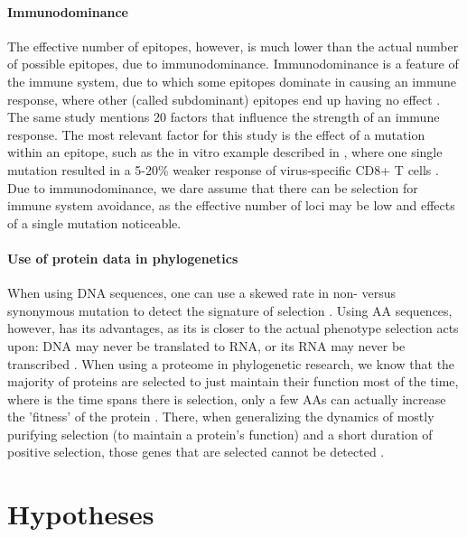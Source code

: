 \paragraph{Immunodominance}

The effective number of epitopes, however,
is much lower than the actual number of possible
epitopes, due to immunodominance. 
Immunodominance is a feature of the immune system,
due to which some epitopes dominate in causing an immune response,
where other (called subdominant) epitopes end up having no 
effect \cite{akram2012immunodominance}.
The same study mentions 20 factors that influence the strength
of an immune response.
The most relevant factor for this study is the effect of
a mutation within an epitope, 
such as the in vitro example described in \cite{berkhoff2004mutation},
where one single mutation resulted in a 5-20\% weaker
response of virus-specific CD8+ T cells .
Due to immunodominance, we dare assume that there can be selection
for immune system avoidance, as the effective number of loci may be
low and effects of a single mutation noticeable.

\paragraph{Use of protein data in phylogenetics}

When using DNA sequences, one can use a skewed rate 
in non- versus synonymous mutation
to detect the signature of selection \cite{murrell2015gene}.
Using AA sequences, however, has its advantages,
as its is closer to the actual phenotype
selection acts upon: DNA may never be translated to RNA,
or its RNA may never be transcribed \cite{diz2012proteomics}
.
When using a proteome in phylogenetic research,
we know that the majority of proteins are selected to just 
maintain their function most of the time, where
is the time spans there is selection, only a few AAs
can actually increase the 'fitness' of the 
protein \cite{anisimova2009investigating}.
There, when generalizing the dynamics of mostly purifying selection (to maintain
a protein's function) and a short duration of positive selection,
those genes that are selected cannot be detected \cite{yang2000statistical}.

\section{Hypotheses}

